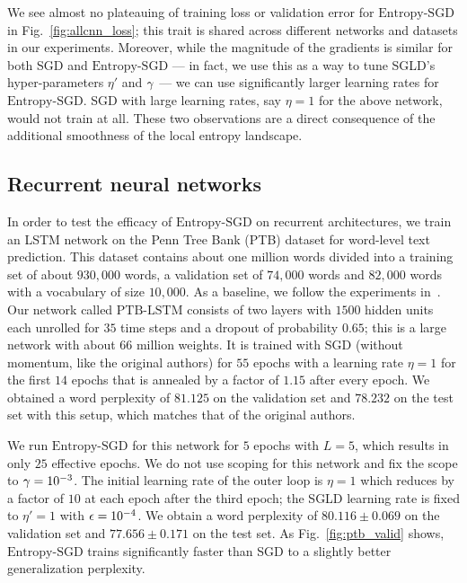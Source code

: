 \documentclass[10pt]{article}
\newcommand{\entropysgd}{\mathrm{Entropy}\textrm{-}\mathrm{SGD}}
\newcommand{\ptblstm}{\textrm{PTB-LSTM}}
\newcommand{\pc}[2]{{\color{ForestGreen}#1}\marginpar{\tiny\noindent{\raggedright{\color{Sienna}[PC]}\color{Sienna}{#2} \par}}}
\begin{document}
We see almost no plateauing of training loss or validation error for $\entropysgd$ in Fig.~\ref{fig:allcnn_loss}; this trait is shared across different networks and datasets in our experiments. Moreover, while the magnitude of the gradients is similar for both SGD and $\entropysgd$ --- in fact, we use this as a way to tune SGLD's hyper-parameters $\eta'$ and $\gamma$ --- we can use significantly larger learning rates for $\entropysgd$. SGD with large learning rates, say $\eta = 1$ for the above network, would not train at all. These two observations are a direct consequence of the additional smoothness of the local entropy landscape.

\subsection{Recurrent neural networks}
\label{ss:expt:rnn}

In order to test the efficacy of $\entropysgd$ on recurrent architectures, we train an LSTM network on the Penn Tree Bank (PTB) dataset for word-level text prediction. This dataset contains about one million words divided into a training set of about $930,000$ words, a validation set of $74,000$ words and $82,000$ words with a vocabulary of size $10,000$. As a baseline, we follow the experiments in~\citet{zaremba2014recurrent}. Our network called $\ptblstm$ consists of two layers with $1500$ hidden units each unrolled for $35$ time steps and a dropout of probability $0.65$; this is a large network with about $66$ million weights. It is trained with SGD (without momentum, like the original authors) for $55$ epochs with a learning rate $\eta = 1$ for the first $14$ epochs that is annealed by a factor of $1.15$ after every epoch. \pc{We obtained a word perplexity of $81.125$ on the validation set and $78.232$}{std-dev} on the test set with this setup, which matches that of the original authors.

We run $\entropysgd$ for this network for $5$ epochs with $L = 5$, which results in only $25$ effective epochs. We do not use scoping for this network and fix the scope to $\gamma = 10^{-3}$. The initial learning rate of the outer loop is $\eta = 1$ which reduces by a factor of $10$ at each epoch after the third epoch; the SGLD learning rate is fixed to $\eta' = 1$ with $\epsilon = 10^{-4}$. We obtain a word perplexity of $80.116 \pm 0.069$ on the validation set and $77.656 \pm 0.171$ on the test set. As Fig.~\ref{fig:ptb_valid} shows, $\entropysgd$ trains significantly faster than SGD to a slightly better generalization perplexity.
\end{document}
